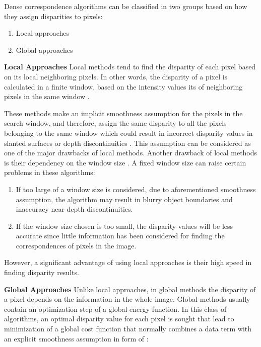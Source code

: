 \documentclass[dvips,letterpaper,12pt]{report}
\begin{document}
Dense correspondence algorithms can be classified in two groups based on how they assign
disparities to pixels:
\begin{enumerate}
\item Local approaches
\item Global approaches
\end{enumerate}

\textbf{Local Approaches}
\newline
Local methods tend to find the disparity of each pixel based on its local neighboring pixels. In
other words, the disparity of a pixel is calculated in a finite window, based on the intensity values
its of neighboring pixels in the same window \cite{sch02}.

These methods make an implicit smoothness assumption for the pixels in the search
window, and therefore, assign the same disparity to all the pixels belonging to the same window which could result in incorrect disparity values in slanted surfaces or
depth discontinuities \cite{hirsch02}. This assumption can be considered as one of the major drawbacks of local methods.
Another drawback of local methods is their dependency on the window size \cite{sch02}. A fixed window size can raise certain problems in these algorithms:
\begin{enumerate}
\item If too large of a window size is considered, due to aforementioned smoothness assumption, the algorithm may result in blurry object boundaries and inaccuracy near depth discontinuities.
\item If the window size chosen is too small, the disparity values will be less accurate since little information has been considered for 
finding the correspondences of pixels in the image.
\end{enumerate}

However, a significant advantage of using local approaches is their high speed in finding disparity results.\newline

\textbf {Global Approaches}
\newline
Unlike local approaches, in global methods the disparity of a pixel depends on the information in
the whole image. Global methods usually contain an optimization step of a global energy
function. In this class of algorithms, an optimal disparity value for each pixel is sought that lead to minimization of a global cost
function that normally combines a data term with an explicit smoothness assumption in form of \cite{roy98,bobi99,boyk01}:
\end{document}
